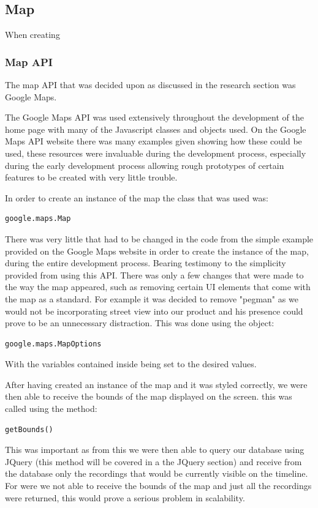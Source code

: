 \documentclass{l3proj}
\begin{document}
\subsection{Map}

When creating 

\subsubsection{Map API}

The map API that was decided upon as discussed in the research section
was Google Maps. 

The Google Maps API was used extensively throughout the development of
the home page with many of the Javascript classes and objects used. On
the Google Maps API website there was many examples given showing how
these could be used, these resources were invaluable during the
development process, especially during the early development process
allowing rough prototypes of certain features to be created with very
little trouble.

In order to create an instance of the map the class that was used was:
\begin{verbatim}
google.maps.Map
\end{verbatim}
There was very little that had to be changed in the code from the
simple example provided on the Google Maps website in order to create
the instance of the map, during the entire development
process. Bearing testimony to the simplicity provided from using this
API. There was only a few changes that were made to the way the map
appeared, such as removing certain UI elements that come with the map
as a standard. For example it was decided to remove "pegman" as we
would not be incorporating street view into our product and his
presence could prove to be an unnecessary distraction. This was done
using the object:
\begin{verbatim}
google.maps.MapOptions
\end{verbatim}
With the variables contained inside being set to the desired values.

After having created an instance of the map and it was styled
correctly, we were then able to receive the bounds of the map
displayed on the screen. this was called using the method:
\begin{verbatim}
getBounds()
\end{verbatim}
This was important as from this we were then able to query our
database using JQuery (this method will be covered in a the JQuery
section) and receive from the database only the recordings that would
be currently visible on the timeline. For were we not able to receive
the bounds of the map and just all the recordings were returned, this
would prove a serious problem in scalability.
\end{document}
